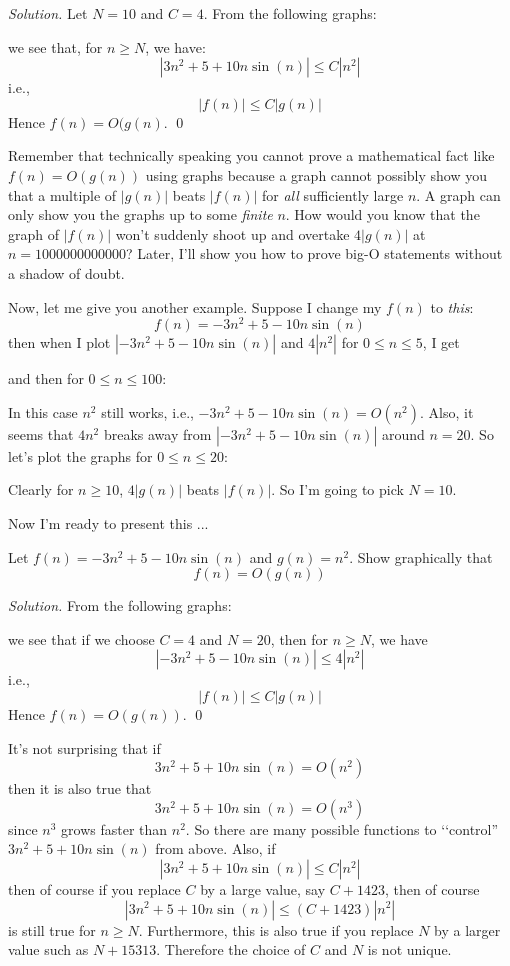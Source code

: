 \textit{Solution.}
Let $N = 10$ and $C = 4$.
From the following graphs:


we see that, for $n \geq N$, we have:
\[
|3n^2 + 5 + 10n \sin(n)| \leq C |n^2|
\]
i.e.,
\[
|f(n)| \leq C|g(n)|
\]
Hence $f(n) = O(g(n)$.
\qed

Remember that technically speaking you cannot prove a mathematical
fact like $f(n) = O(g(n))$ using graphs
because a graph cannot possibly show you that a multiple of $|g(n)|$
beats $|f(n)|$ for \textit{all} sufficiently large $n$.
A graph can only show you the graphs up to some \textit{finite} $n$.
How would you know that the graph 
of $|f(n)|$ won't suddenly shoot up and overtake $4|g(n)|$ at 
$n = 1000000000000$?
Later, I'll show you how to prove big-O statements without a shadow of doubt.

Now, let me give you another example.
Suppose I change my $f(n)$ to \textit{this}:
\[
f(n) = -3n^2 + 5 - 10 n \sin (n)
\]
then when I plot
$|-3n^2 + 5 - 10 n \sin (n)|$ 
and $4|n^2|$ for $0 \leq n \leq 5$,
I get

and then for $0 \leq n \leq 100$:

In this case $n^2$ still works, i.e., 
$-3n^2 + 5 - 10 n \sin (n) = O(n^2)$.
Also, it seems that $4n^2$ breaks away from 
$|-3n^2+5-10n \sin(n)|$ around $n = 20$.
So let's plot the graphs for $0 \leq n \leq 20$:

Clearly for $n \geq 10$, $4|g(n)|$ beats $|f(n)|$.
So I'm going to pick $N = 10$.

Now I'm ready to present this ...

\newpage

\begin{eg}
Let $f(n) = -3n^2+5-10n \sin(n)$ and $g(n) = n^2$.
Show graphically that 
\[
f(n) = O(g(n))
\]
\end{eg}

\textit{Solution.}
From the following graphs:


we see that if we choose $C = 4$ and $N  = 20$, then for $n \geq N$,
we have
\[
|-3n^2+5-10n \sin(n)| \leq 4|n^2|
\]
i.e.,
\[
|f(n)| \leq C|g(n)|
\]
Hence $f(n) = O(g(n))$.
\qed

\newpage

It's not surprising that if 
\[
3n^2 + 5 + 10 n \sin (n) = O(n^2)
\]
then it is also true that 
\[
3n^2 + 5 + 10 n \sin (n) = O(n^3)
\]
since $n^3$ grows faster than $n^2$.
So there are many possible functions to \lq\lq control''
$3n^2 + 5 + 10n \sin(n)$ from above.
Also, if
\[
|3n^2 + 5 + 10 n \sin (n)| \leq C|n^2|
\]
then of course if you replace $C$ by a large value, say $C + 1423$,
then of course
\[
|3n^2 + 5 + 10 n \sin (n)| \leq (C + 1423)|n^2|
\]
is still true for $n \geq N$.
Furthermore, this is also true if you replace $N$ by a larger value
such as $N + 15313$.
Therefore the choice of $C$ and $N$ is not unique.


